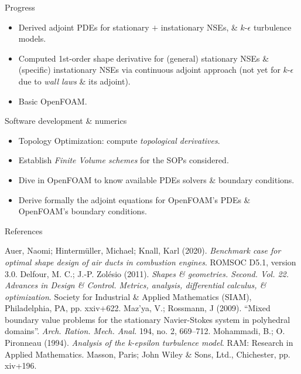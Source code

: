 \documentclass[10pt
hyperref={
    pdfauthor={Hong Quan Ba Nguyen},
    pdftitle={Optimal Shape Design of Air Ducts in Combustion Engines: Design a General Framework},
    pdfsubject={Talk},
    pdfcreator={LaTeX},
}
]{beamer}
\begin{document}
\begin{frame}{Progress}
    \begin{itemize}
        \item Derived adjoint PDEs for stationary $+$ instationary NSEs, {\small\&} $k$-$\epsilon$ turbulence models.
        \item Computed 1st-order shape derivative for (general) stationary NSEs {\small\&} (specific) instationary NSEs via continuous adjoint approach (not yet for $k$-$\epsilon$ due to \textit{wall laws} {\small\&} its adjoint).        
        \item Basic OpenFOAM.
    \end{itemize}
\end{frame}

\begin{frame}{Software development {\small\&} numerics}
    \begin{itemize}
        \item Topology Optimization: compute \textit{topological derivatives}.
        \item Establish \textit{Finite Volume schemes} for the SOPs considered.
        \item Dive in OpenFOAM to know available PDEs solvers {\small\&} boundary conditions.
        \item Derive formally the adjoint equations for OpenFOAM's PDEs {\small\&} OpenFOAM's boundary conditions.
    \end{itemize}
\end{frame}

\begin{frame}{References}
    \begin{thebibliography}{99}
         Auer, Naomi; Hinterm\"uller, Michael; Knall, Karl (2020). \textit{Benchmark case for optimal shape design of air ducts in combustion engines}. ROMSOC D5.1, version 3.0.
         Delfour, M. C.; J.-P. Zolésio (2011). \textit{Shapes {\small\&} geometries. Second. Vol. 22. Advances in Design {\small\&} Control. Metrics, analysis, differential calculus, {\small\&} optimization}. Society for Industrial {\small\&} Applied Mathematics (SIAM), Philadelphia, PA, pp. xxiv+622.
         Maz'ya, V.; Rossmann, J (2009). ``Mixed boundary value problems for the stationary Navier-Stokes system in polyhedral domains''. \textit{Arch. Ration. Mech. Anal.} 194, no. 2, 669--712.
         Mohammadi, B.; O. Pironneau (1994). \textit{Analysis of the k-epsilon turbulence model}. RAM: Research in Applied Mathematics. Masson, Paris; John Wiley {\small\&} Sons, Ltd., Chichester, pp. xiv+196.
    \end{thebibliography}
\end{frame}
\end{document}
